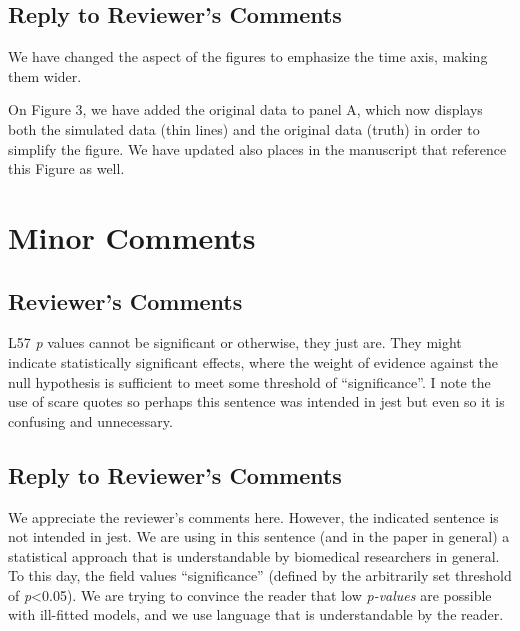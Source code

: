 \documentclass[
]{article}
\begin{document}
\hypertarget{section-16}{%
\subsection{\texorpdfstring{\textcolor{reviewersblue} {Reply to Reviewer's Comments}}{}}\label{section-16}}

We have changed the aspect of the figures to emphasize the time axis, making them wider.

On Figure 3, we have added the original data to panel A, which now displays both the simulated data (thin lines) and the original data (truth) in order to simplify the figure. We have updated also places in the manuscript that reference this Figure as well.

\hypertarget{minor-comments}{%
\section{Minor Comments}\label{minor-comments}}

\hypertarget{reviewers-comments-16}{%
\subsection{Reviewer's Comments}\label{reviewers-comments-16}}

L57 \emph{p} values cannot be significant or otherwise, they just are. They might indicate statistically significant effects, where the weight of evidence against the null hypothesis is sufficient to meet some threshold of ``significance''. I note the use of scare quotes so perhaps this sentence was intended in jest but even
so it is confusing and unnecessary.

\hypertarget{section-17}{%
\subsection{\texorpdfstring{\textcolor{reviewersblue} {Reply to Reviewer's Comments}}{}}\label{section-17}}

We appreciate the reviewer's comments here. However, the indicated sentence is not intended in jest. We are using in this sentence (and in the paper in general) a statistical approach that is understandable by biomedical researchers in general. To this day, the field values ``significance'' (defined by the arbitrarily set threshold of \emph{p}\textless0.05). We are trying to convince the reader that low \emph{p-values} are possible with ill-fitted models, and we use language that is understandable by the reader.
\end{document}

